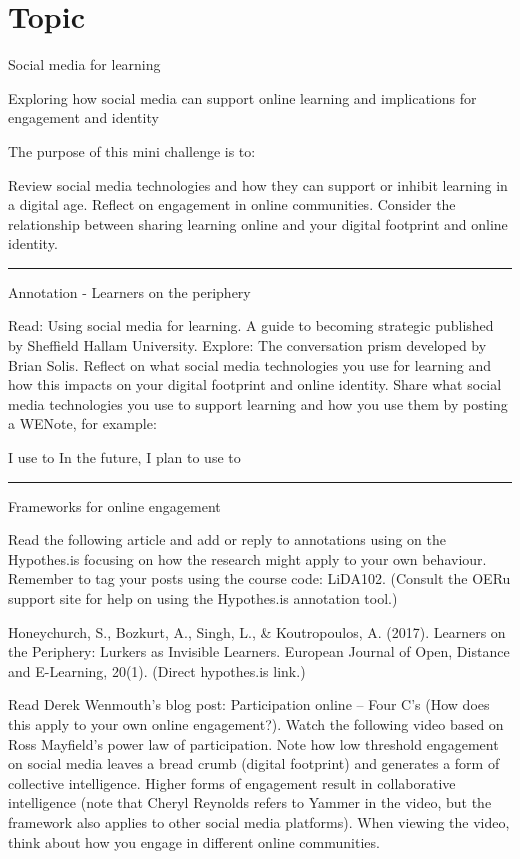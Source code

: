\documentclass[
]{book}
\theoremstyle{definition}
\theoremstyle{definition}
\theoremstyle{definition}
\theoremstyle{definition}
\theoremstyle{remark}
\begin{document}
\hypertarget{topic-7}{%
\section{Topic}\label{topic-7}}

Social media for learning

Exploring how social media can support online learning and implications for engagement and identity

The purpose of this mini challenge is to:

Review social media technologies and how they can support or inhibit learning in a digital age.
Reflect on engagement in online communities.
Consider the relationship between sharing learning online and your digital footprint and online identity.

\begin{center}\rule{0.5\linewidth}{0.5pt}\end{center}

Annotation - Learners on the periphery

Read: Using social media for learning. A guide to becoming strategic published by Sheffield Hallam University.
Explore: The conversation prism developed by Brian Solis.
Reflect on what social media technologies you use for learning and how this impacts on your digital footprint and online identity.
Share what social media technologies you use to support learning and how you use them by posting a WENote, for example:

I use to
In the future, I plan to use to

\begin{center}\rule{0.5\linewidth}{0.5pt}\end{center}

Frameworks for online engagement

Read the following article and add or reply to annotations using on the Hypothes.is focusing on how the research might apply to your own behaviour. Remember to tag your posts using the course code: LiDA102. (Consult the OERu support site for help on using the Hypothes.is annotation tool.)

Honeychurch, S., Bozkurt, A., Singh, L., \& Koutropoulos, A. (2017). Learners on the Periphery: Lurkers as Invisible Learners. European Journal of Open, Distance and E-Learning, 20(1). (Direct hypothes.is link.)

Read Derek Wenmouth's blog post: Participation online -- Four C's (How does this apply to your own online engagement?).
Watch the following video based on Ross Mayfield's power law of participation. Note how low threshold engagement on social media leaves a bread crumb (digital footprint) and generates a form of collective intelligence. Higher forms of engagement result in collaborative intelligence (note that Cheryl Reynolds refers to Yammer in the video, but the framework also applies to other social media platforms). When viewing the video, think about how you engage in different online communities.
\end{document}
